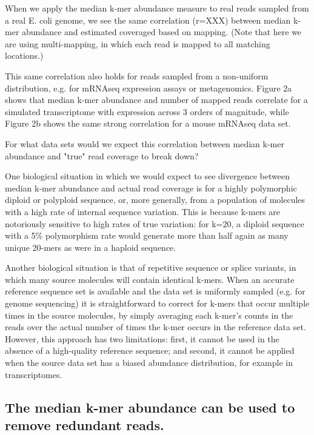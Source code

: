 \documentclass[10pt]{article}
\begin{document}
When we apply the median k-mer abundance measure to real reads sampled
from a real E. coli genome, we see the same correlation (r=XXX)
between median k-mer abundance and estimated coveraged based on mapping.
(Note that here we are using multi-mapping, in which each read is mapped
to all matching locations.)

This same correlation also holds for reads sampled from a non-uniform
distribution, e.g. for mRNAseq expression assays or metagenomics.
Figure 2a shows that median k-mer abundance and number of mapped reads
correlate for a simulated transcriptome with expression across 3
orders of magnitude, while Figure 2b shows the same strong correlation
for a mouse mRNAseq data set.

For what data sets would we expect this correlation between median
k-mer abundance and "true" read coverage to break down?

One biological situation in which we would expect to see divergence
between median k-mer abundance and actual read coverage is for a
highly polymorphic diploid or polyploid sequence, or, more generally,
from a population of molecules with a high rate of internal sequence
variation.  This is because k-mers are notoriously sensitive to high
rates of true variation: for k=20, a diploid sequence with a 5\%
polymorphism rate would generate more than half again as many unique
20-mers as were in a haploid sequence.

Another biological situation is that of repetitive sequence or splice
variants, in which many source molecules will contain identical
k-mers.  When an accurate reference sequence set is available and the
data set is uniformly sampled (e.g. for genome sequencing) it is
straightforward to correct for k-mers that occur multiple times in the
source molecules, by simply averaging each k-mer's counts in the reads
over the actual number of times the k-mer occurs in the reference data
set.  However, this approach has two limitations: first, it cannot be
used in the absence of a high-quality reference sequence; and second,
it cannot be applied when the source data set has a biased abundance
distribution, for example in transcriptomes.


\subsection*{The median k-mer abundance can be used to remove redundant reads.}
\end{document}

